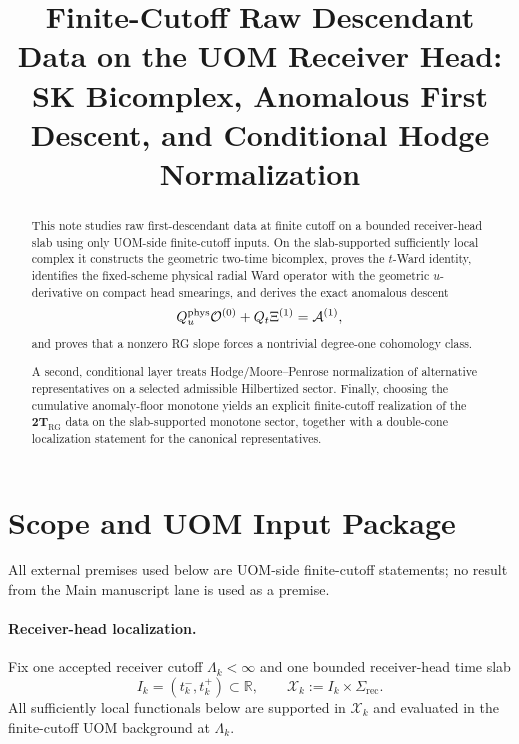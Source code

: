 \documentclass[11pt]{article}
\title{Finite-Cutoff Raw Descendant Data on the UOM Receiver Head:\\
SK Bicomplex, Anomalous First Descent, and Conditional Hodge Normalization}
\author{}
\date{}
\theoremstyle{definition}
\theoremstyle{plain}
\theoremstyle{remark}
\newcommand{\Xscr}{\mathscr X}
\newcommand{\Islab}{I_k}
\newcommand{\Ozero}{\mathcal O^{(0)}}
\newcommand{\Aone}{\mathcal A^{(1)}}
\newcommand{\Xione}{\Xi^{(1)}}
\newcommand{\Qt}{Q_t}
\newcommand{\Quphys}{Q_u^{\rm phys}}
\newcommand{\rec}{\mathrm{rec}}
\begin{document}
\maketitle

\begin{abstract}
This note studies raw first-descendant data at finite cutoff on a bounded receiver-head slab using
only UOM-side finite-cutoff inputs.
On the slab-supported sufficiently local complex it constructs the geometric two-time bicomplex,
proves the \(t\)-Ward identity, identifies the fixed-scheme physical radial Ward operator with the
geometric \(u\)-derivative on compact head smearings, and derives the exact anomalous descent
\[
\Quphys \Ozero + \Qt \Xione = \Aone,
\]
and proves that a nonzero RG slope forces a nontrivial degree-one cohomology class.

A second, conditional layer treats Hodge/Moore--Penrose normalization of alternative
representatives on a selected admissible Hilbertized sector.
Finally, choosing the cumulative anomaly-floor monotone yields an explicit finite-cutoff
realization of the \(\mathbf{2T}_{\mathrm{RG}}\) data on the slab-supported monotone sector,
together with a double-cone localization statement for the canonical representatives.
\end{abstract}

\tableofcontents

\section{Scope and UOM Input Package}
\label{sec:uomdesc-scope}

All external premises used below are UOM-side finite-cutoff statements; no result from the Main
manuscript lane is used as a premise.

\paragraph{Receiver-head localization.}
Fix one accepted receiver cutoff \(\Lambda_k<\infty\) and one bounded receiver-head time slab
\[
\Islab=(t_k^-,t_k^+)\subset \mathbb R,
\qquad
\Xscr_k:=\Islab\times \Sigma_{\rec}.
\]
All sufficiently local functionals below are supported in \(\Xscr_k\) and evaluated in the
finite-cutoff UOM background at \(\Lambda_k\).
\end{document}
